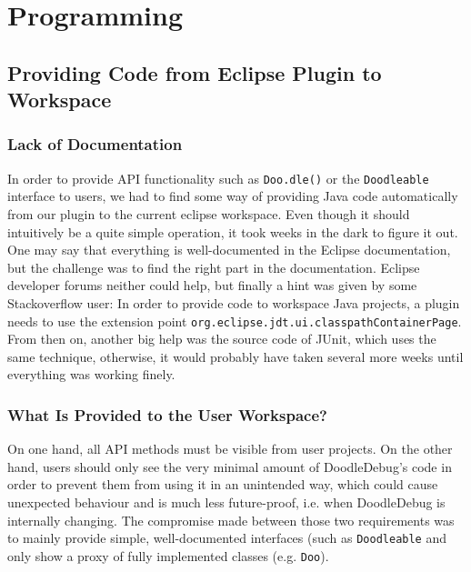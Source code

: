 \documentclass{report}
\begin{document}
\section*{Programming}

\subsection*{Providing Code from Eclipse Plugin to Workspace}
\subsubsection*{Lack of Documentation}
In order to provide API functionality such as \verb-Doo.dle()- or the \verb-Doodleable- interface to users, we had to find some way of providing Java code automatically from our plugin to the current eclipse workspace. Even though it should intuitively be a quite simple operation, it took weeks in the dark to figure it out. One may say that everything is well-documented in the Eclipse documentation, but the challenge was to find the right part in the documentation. Eclipse developer forums neither could help, but finally a hint was given by some Stackoverflow user: In order to provide code to workspace Java projects, a plugin needs to use the extension point \verb-org.eclipse.jdt.ui.classpathContainerPage-. From then on, another big help was the source code of JUnit, which uses the same technique, otherwise, it would probably have taken several more weeks until everything was working finely.
\subsubsection*{What Is Provided to the User Workspace?}
On one hand, all API methods must be visible from user projects. On the other hand, users should only see the very minimal amount of DoodleDebug's code in order to prevent them from using it in an unintended way, which could cause unexpected behaviour and is much less future-proof, i.e. when DoodleDebug is internally changing. The compromise made between those two requirements was to mainly provide simple, well-documented interfaces (such as \verb-Doodleable- and only show a proxy of fully implemented classes (e.g. \verb-Doo-).
\end{document}
